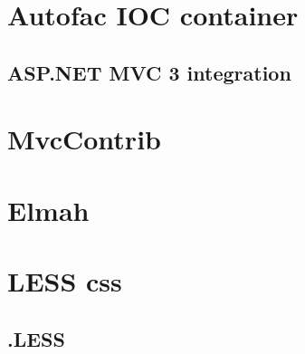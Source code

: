 \section{Autofac IOC container}
\label{sec:autofac}

\subsection{ASP.NET MVC 3 integration}



\section{MvcContrib}
\label{sec:mvcContrib}



\section{Elmah}
\label{sec:elmah}


\section{LESS css}
\label{sec:lesscss}

\subsection{.LESS}




























